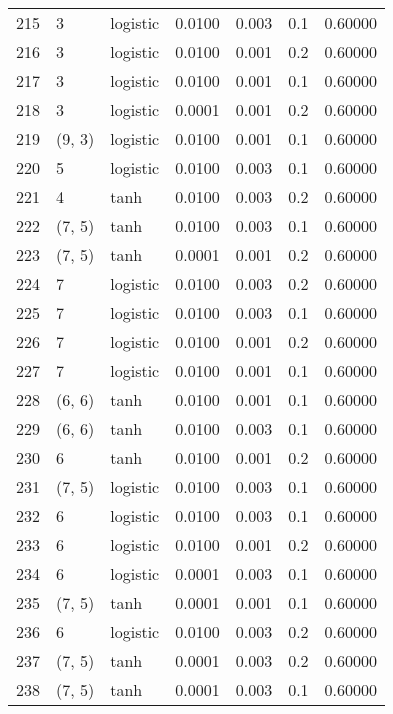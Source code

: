 \begin{tabular}{lllrrrr}
215 &           3 &  logistic &  0.0100 &  0.003 &  0.1 &   0.60000 \\
216 &           3 &  logistic &  0.0100 &  0.001 &  0.2 &   0.60000 \\
217 &           3 &  logistic &  0.0100 &  0.001 &  0.1 &   0.60000 \\
218 &           3 &  logistic &  0.0001 &  0.001 &  0.2 &   0.60000 \\
219 &      (9, 3) &  logistic &  0.0100 &  0.001 &  0.1 &   0.60000 \\
220 &           5 &  logistic &  0.0100 &  0.003 &  0.1 &   0.60000 \\
221 &           4 &      tanh &  0.0100 &  0.003 &  0.2 &   0.60000 \\
222 &      (7, 5) &      tanh &  0.0100 &  0.003 &  0.1 &   0.60000 \\
223 &      (7, 5) &      tanh &  0.0001 &  0.001 &  0.2 &   0.60000 \\
224 &           7 &  logistic &  0.0100 &  0.003 &  0.2 &   0.60000 \\
225 &           7 &  logistic &  0.0100 &  0.003 &  0.1 &   0.60000 \\
226 &           7 &  logistic &  0.0100 &  0.001 &  0.2 &   0.60000 \\
227 &           7 &  logistic &  0.0100 &  0.001 &  0.1 &   0.60000 \\
228 &      (6, 6) &      tanh &  0.0100 &  0.001 &  0.1 &   0.60000 \\
229 &      (6, 6) &      tanh &  0.0100 &  0.003 &  0.1 &   0.60000 \\
230 &           6 &      tanh &  0.0100 &  0.001 &  0.2 &   0.60000 \\
231 &      (7, 5) &  logistic &  0.0100 &  0.003 &  0.1 &   0.60000 \\
232 &           6 &  logistic &  0.0100 &  0.003 &  0.1 &   0.60000 \\
233 &           6 &  logistic &  0.0100 &  0.001 &  0.2 &   0.60000 \\
234 &           6 &  logistic &  0.0001 &  0.003 &  0.1 &   0.60000 \\
235 &      (7, 5) &      tanh &  0.0001 &  0.001 &  0.1 &   0.60000 \\
236 &           6 &  logistic &  0.0100 &  0.003 &  0.2 &   0.60000 \\
237 &      (7, 5) &      tanh &  0.0001 &  0.003 &  0.2 &   0.60000 \\
238 &      (7, 5) &      tanh &  0.0001 &  0.003 &  0.1 &   0.60000 \\

\end{tabular}
